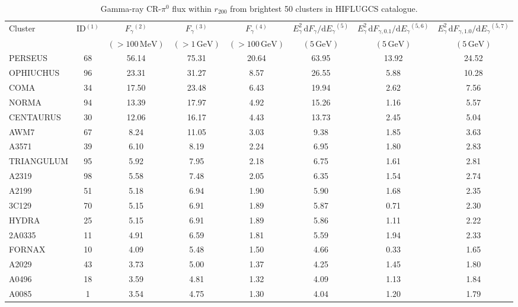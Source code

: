 \documentclass[10pt,aps,pra,reprint,amsmath,amsfonts,amssymb,showpacs,nofootinbib,floatfix]{revtex4-1}
\newcommand{\rmn}{\mathrm}
\newcommand{\dd}{\rmn{d}}
\newcommand{\rvir}{r_{200}}
\newcommand{\eg}{E_\gamma}
\begin{document}
\begin{table}
\begin{minipage}{2.0\columnwidth}
  \caption{Gamma-ray CR-$\pi^0$ flux within $\rvir$ from brightest 50 clusters in HIFLUGCS catalogue.}
\begin{tabular}{l  c c c c c c c}
\hline
\hline
 Cluster & ID$^{(1)}$ & $F_{\gamma}$$^{(2)}$ & $F_{\gamma}$$^{(3)}$& 
 $F_{\gamma}$$^{(4)}$ & $\eg^2\,\dd F_{\gamma}/\dd \eg$$^{(5)}$ &
 $\eg^2\,\dd F_{\gamma,0.1}/\dd \eg$$^{(5,6)}$ & 
 $\eg^2\,\dd F_{\gamma,1.0}/\dd \eg$$^{(5,7)}$\\
  & & $(>100\,\rmn{MeV})$ & $(>1\,\rmn{GeV})$ & $(>100\,\rmn{GeV})$ & 
 $(5\,\rmn{GeV})$ & $(5\,\rmn{GeV})$ &  $(5\,\rmn{GeV})$\\
 \hline
PERSEUS  &  68 &  56.14 &  75.31 &  20.64 &  63.95 &  13.92 &  24.52 \\
OPHIUCHUS &  96 &  23.31 &  31.27 &   8.57 &  26.55 &   5.88 &  10.28 \\
COMA     &  34 &  17.50 &  23.48 &   6.43 &  19.94 &   2.62 &   7.56 \\
NORMA    &  94 &  13.39 &  17.97 &   4.92 &  15.26 &   1.16 &   5.57 \\
CENTAURUS &  30 &  12.06 &  16.17 &   4.43 &  13.73 &   2.45 &   5.04 \\
AWM7     &  67 &   8.24 &  11.05 &   3.03 &   9.38 &   1.85 &   3.63 \\
A3571    &  39 &   6.10 &   8.19 &   2.24 &   6.95 &   1.80 &   2.83 \\
TRIANGULUM &  95 &   5.92 &   7.95 &   2.18 &   6.75 &   1.61 &   2.81 \\
A2319    &  98 &   5.58 &   7.48 &   2.05 &   6.35 &   1.54 &   2.74 \\
A2199    &  51 &   5.18 &   6.94 &   1.90 &   5.90 &   1.68 &   2.35 \\
3C129    &  70 &   5.15 &   6.91 &   1.89 &   5.87 &   0.71 &   2.30 \\
HYDRA    &  25 &   5.15 &   6.91 &   1.89 &   5.86 &   1.11 &   2.22 \\
2A0335   &  11 &   4.91 &   6.59 &   1.81 &   5.59 &   1.94 &   2.33 \\
FORNAX   &  10 &   4.09 &   5.48 &   1.50 &   4.66 &   0.33 &   1.65 \\
A2029    &  43 &   3.73 &   5.00 &   1.37 &   4.25 &   1.45 &   1.80 \\
A0496    &  18 &   3.59 &   4.81 &   1.32 &   4.09 &   1.13 &   1.84 \\
A0085    &   1 &   3.54 &   4.75 &   1.30 &   4.04 &   1.20 &   1.79 \\

\end{tabular}
\end{minipage}
\end{table}
\end{document}
